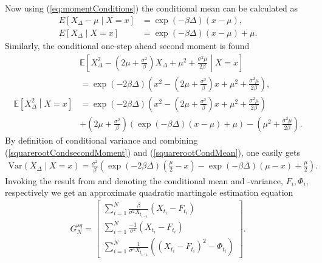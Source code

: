 Now using (\ref{eq:momentConditions}) the conditional mean can be calculated as
\begin{align}
    E\left[X_\Delta - \mu \middle| X = x\right] &= \exp\left(-\beta\Delta\right)\left(x-\mu\right),\\
    E\left[X_\Delta \middle| X = x\right] &= \exp\left(-\beta\Delta\right)\left(x-\mu\right) + \mu. \label{squarerootCondMean}
\end{align}
Similarly, the conditional one-step ahead second moment is found
\begin{align}
    &\mathbb{E}\left[X_\Delta^2 - \left(2\mu + \frac{\sigma^2}{\beta}\right)X_\Delta + \mu^2 + \frac{\sigma^2\mu}{2\beta} \middle| X = x \right] \nonumber \\
    &= \exp\left(-2\beta \Delta\right)\left(x^2 - \left(2\mu + \frac{\sigma^2}{\beta}\right)x + \mu^2 + \frac{\sigma^2 \mu}{2\beta}\right),\\
    \mathbb{E}\left[X_\Delta^2 \middle| X = x\right] &= \exp\left(-2\beta \Delta\right)\left(x^2 - \left(2\mu + \frac{\sigma^2}{\beta}\right)x + \mu^2 + \frac{\sigma^2 \mu}{2\beta}\right)  \nonumber  \\
     &+ \left(2\mu + \frac{\sigma^2}{\beta}\right) \left(\exp\left(-\beta\Delta\right)\left(x-\mu\right) + \mu\right) - \left(\mu^2 + \frac{\sigma^2\mu}{2\beta}\right). \label{squarerootCondsecondMoment}
\end{align}
By definition of conditional variance and combining (\ref{squarerootCondsecondMoment}) and (\ref{squarerootCondMean}), one easily gets
\begin{align}
    \mathrm{Var}\left(X_\Delta \middle| X = x \right) = \frac{\sigma^2}{\beta}\left(\exp\left(-2\beta\Delta\right)\left(\frac{\mu}{2} - x   \right) - \exp\left(-\beta\Delta \right)\left(\mu - x\right) + \frac{\mu}{2}\right).
\end{align}
Invoking the result from \cite[Example 1.11]{StatisticalMethodsForSDE} and denoting the conditional mean and -variance, $F_i, \Phi_i$, respectively we get an approximate quadratic martingale estimation equation
\begin{align}
        G_N^{sq} = \begin{bmatrix}
            \sum_{i = 1}^N \frac{\beta}{\sigma^2 X_{t_{i-1}}}\left(X_{t_i} - F_{t_i}\right)\\
            \sum_{i = 1}^N \frac{-1}{\sigma^2}\left(X_{t_i} - F_{t_i}\right)\\
            \sum_{i = 1}^N \frac{1}{\sigma^3 X_{t_{i-1}}}\left(\left(X_{t_i} - F_{t_i}\right)^2 - \Phi_{t_i}\right) \label{eq:squarerootMartingaleEquation}
        \end{bmatrix}.
\end{align}
